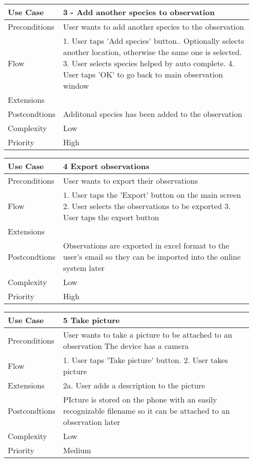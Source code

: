 \begin{tabular}[t]{|l|l|}\hline
Use Case&3 - Add another species to observation\\\hline
Preconditions&User wants to add another species to the observation\\\hline
Flow&1. User taps 'Add species' button.\newline
2. Optionally selects another location, otherwise the same one is selected.
3. User selects species helped by auto complete.
4. User taps 'OK' to go back to main observation window \\\hline  
Extensions& \\\hline
Postcondtions&Additonal species has been added to the observation\\\hline
Complexity&Low\\\hline
Priority&High\\\hline
\end{tabular}

\begin{tabular}[t]{|l|l|}\hline
Use Case&4  Export  observations\\\hline
Preconditions& User wants to export their observations \\\hline
Flow&1. User taps the 'Export' button on the main screen
2. User selects the observations to be exported
3. User taps the export button\\\hline
Extensions& \\\hline
Postcondtions&Observations are exported in excel format to the user's email so they can be imported into the online system later\\\hline
Complexity&Low\\\hline
Priority&High\\\hline
\end{tabular}

\begin{tabular}[t]{|l|l|}\hline
Use Case&5 Take picture\\\hline
Preconditions&User wants to take a picture to be attached to an observation
The device has a camera\\\hline
Flow&1. User taps 'Take picture' button.
2. User takes picture \\\hline
Extensions& 2a. User adds a description to the picture\\\hline
Postcondtions&PIcture is stored on the phone with an easily recognizable filename so it can be attached to an observation later\\\hline
Complexity&Low\\\hline
Priority&Medium\\\hline
\end{tabular}

